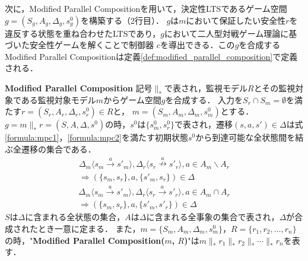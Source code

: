 次に，Modified Parallel Compositionを用いて，決定性LTSであるゲーム空間 $g = (S_{g}, A_{g}, \Delta_{g}, s^0_{g})$を構築する（2行目）．
$g$は$m$において保証したい安全性$r$を違反する状態を重ね合わせたLTSであり，$g$において二人型対戦ゲーム理論に基づいた安全性ゲームを解くことで制御器 $c$を導出できる．この$g$を合成するModified Parallel Compositionは定義\ref{def:modified_parallel_composition}で定義される．
\begin{dfn}{\textbf{Modified Parallel Composition}}
\label{def:modified_parallel_composition}
    記号$\parallel_*$で表され，監視モデル$R$とその監視対象である監視対象モデル$m$からゲーム空間$g$を合成する．
    入力を$S_{r} \cap S_{m} = \emptyset$を満たす$r = (S_{r}, A_{r}, \Delta_{r}, s^0_{r}) \in R$と，
    $m = (S_{m}, A_{m}, \Delta_{m}, s^0_{m})$とする．
    $g = m \parallel_* r = (S, A, \Delta, s^0)$の時，$s^0$は$\{ s^0_{m}, s^0_{r} \}$で表され，遷移$(s,a,s')\in\Delta$は式\ref{formula:mpc1}，\ref{formula:mpc2}を満たす初期状態$s^0$から到達可能な全状態間を結ぶ全遷移の集合である．
    \begin{multline}
    \label{formula:mpc1}
    \Delta_m \langle s_{m} \overset{a}{\rightarrow} s'_{m} \rangle, \Delta_r \langle s_{r} \overset{a}{\nrightarrow} s'_{r} \rangle, a \in A_{m} \backslash A_{r}\\
    \Rightarrow (\{ s_{m},s_{r} \},a,\{ s'_{m},s_{r} \} ) \in \Delta
    \end{multline}
    \begin{multline}
    \label{formula:mpc2}
    \Delta_m \langle s_{m} \overset{a}{\rightarrow} s'_{m} \rangle, \Delta_r \langle s_{r} \overset{a}{\rightarrow} s'_{r} \rangle, a \in A_{m} \cap A_{r}\\
    \Rightarrow (\{ s_{m},s_{r} \},a,\{ s'_{m},s'_{r} \}) \in \Delta
    \end{multline}
    $S$は$\Delta$に含まれる全状態の集合，$A$は$\Delta$に含まれる全事象の集合で表され，$\Delta$が合成されたとき一意に定まる．
    また，$m = \{S_{m}, A_{m}, \Delta_{m}, s^0_{m}\}$，$R = \{r_1, r_2, \ldots, r_n\}$の時，"{\bf Modified Parallel Composition($m$, $R$)}"は$m \parallel_* r_1 \parallel_* r_2 \parallel_* \cdots \parallel_* r_n$を表す．
\end{dfn}

